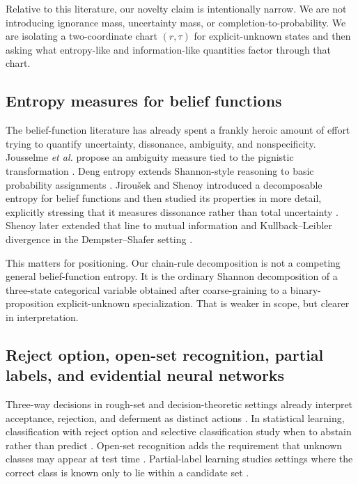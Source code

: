 \documentclass[11pt]{article}
\newcommand{\1}{\mathbf{1}}
\begin{document}
Relative to this literature, our novelty claim is intentionally narrow. We are not introducing ignorance mass, uncertainty mass, or completion-to-probability. We are isolating a two-coordinate chart $(r,\tau)$ for explicit-unknown states and then asking what entropy-like and information-like quantities factor through that chart.

\subsection{Entropy measures for belief functions}

The belief-function literature has already spent a frankly heroic amount of effort trying to quantify uncertainty, dissonance, ambiguity, and nonspecificity. Jousselme \emph{et al.} propose an ambiguity measure tied to the pignistic transformation \citep{JousselmeLiuGrenierBosse06}. Deng entropy extends Shannon-style reasoning to basic probability assignments \citep{Deng16}. Jirou\v{s}ek and Shenoy introduced a decomposable entropy for belief functions and then studied its properties in more detail, explicitly stressing that it measures dissonance rather than total uncertainty \citep{JirousekShenoy18,JirousekShenoy20}. Shenoy later extended that line to mutual information and Kullback--Leibler divergence in the Dempster--Shafer setting \citep{Shenoy24}. 

This matters for positioning. Our chain-rule decomposition is not a competing general belief-function entropy. It is the ordinary Shannon decomposition of a three-state categorical variable obtained after coarse-graining to a binary-proposition explicit-unknown specialization. That is weaker in scope, but clearer in interpretation.

\subsection{Reject option, open-set recognition, partial labels, and evidential neural networks}

Three-way decisions in rough-set and decision-theoretic settings already interpret acceptance, rejection, and deferment as distinct actions \citep{Yao10,Yao12}. In statistical learning, classification with reject option and selective classification study when to abstain rather than predict \citep{FrancPrusaVoracek23}. Open-set recognition adds the requirement that unknown classes may appear at test time \citep{GengHuangChen21}. Partial-label learning studies settings where the correct class is known only to lie within a candidate set \citep{FuchsKalinkeBohm24}. 
\end{document}

